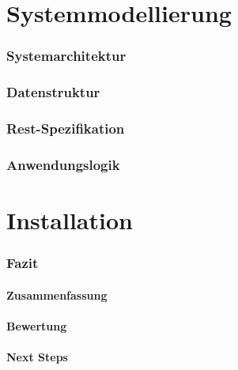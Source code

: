\documentclass[a4paper,11pt]{article}%
\renewcommand{\\}{\vspace*{0.5\baselineskip} \newline}
\begin{document}
\newpage
\vspace*{\fill}
\part{Systemmodellierung}
\vfill
\newpage
\section{Systemarchitektur}

\section{Datenstruktur}

\section{Rest-Spezifikation}

\section{Anwendungslogik}

\newpage
\vspace*{\fill}
\part{Installation}
\vfill
\newpage

\section{Fazit}

\subsection{Zusammenfassung}

\subsection{Bewertung}

\subsection{Next Steps}

\newpage
\end{document}
